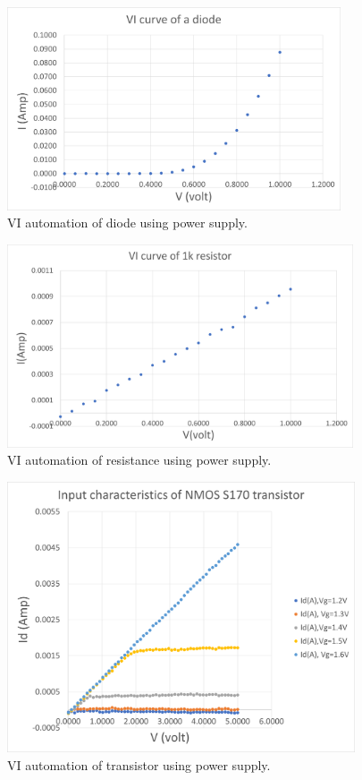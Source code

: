\documentclass[12pt,a4paper,bold]{thesis}
\theoremstyle{thm}
\theoremstyle{definition}
\begin{document}
\begin{figure}[H]
	\centering
   \includegraphics[height=6cm]{Images/46.png} 
   \caption{VI automation of diode using power supply.}
\end{figure}
\begin{figure}[H]
	\centering
   \includegraphics[height=6cm]{Images/47.png} 
   \caption{VI automation of resistance using power supply.}
\end{figure}

\begin{figure}[H]
	\centering
   \includegraphics[height=8cm]{Images/48.png} 
   \caption{VI automation of transistor using power supply.}
\end{figure}
\end{document}
